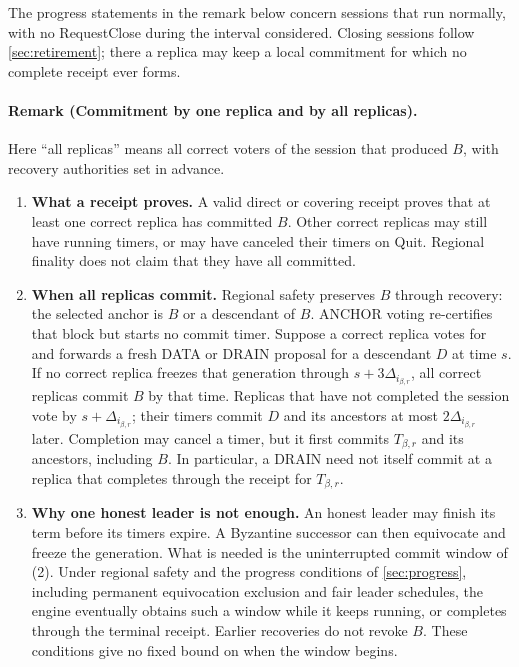 \documentclass[11pt,a4paper]{article}
\begin{document}
The progress statements in the remark below concern sessions that run
normally, with no RequestClose during the interval considered. Closing
sessions follow \cref{sec:retirement}; there a replica may keep a local
commitment for which no complete receipt ever forms.

\paragraph{Remark (Commitment by one replica and by all replicas).}
Here ``all replicas'' means all correct voters of the session that
produced $B$, with recovery authorities set in advance.
\begin{enumerate}[label=(\arabic*),itemsep=4pt]
\item \textbf{What a receipt proves.} A valid direct or covering receipt
proves that at least one correct replica has committed $B$. Other correct
replicas may still have running timers, or may have canceled their timers
on Quit. Regional finality does not claim that they have all committed.

\item \textbf{When all replicas commit.} Regional safety preserves $B$
through recovery: the selected anchor is $B$ or a descendant of $B$.
ANCHOR voting re-certifies that block but starts no commit timer.
Suppose a correct replica votes for and forwards a fresh DATA or DRAIN
proposal for a descendant $D$ at time $s$. If no correct replica freezes
that generation through $s+3\Delta_{i_{\beta,r}}$, all correct replicas
commit $B$ by that time. Replicas that have not completed the session
vote by $s+\Delta_{i_{\beta,r}}$; their timers commit $D$ and its
ancestors at most $2\Delta_{i_{\beta,r}}$ later. Completion may cancel a
timer, but it first commits $T_{\beta,r}$ and its ancestors, including
$B$. In particular, a DRAIN need not itself commit at a replica that
completes through the receipt for $T_{\beta,r}$.

\item \textbf{Why one honest leader is not enough.} An honest leader may
finish its term before its timers expire. A Byzantine successor can then
equivocate and freeze the generation. What is needed is the uninterrupted
commit window of (2). Under regional safety and the progress conditions
of \cref{sec:progress}, including permanent equivocation exclusion and
fair leader schedules, the engine eventually obtains such a window while
it keeps running, or completes through the terminal receipt. Earlier
recoveries do not revoke $B$. These conditions give no fixed bound on
when the window begins.


\end{enumerate}
\end{document}
